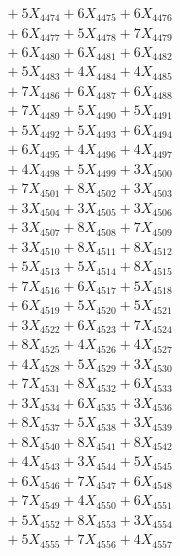 \documentclass[a4paper,10pt]{article}
\begin{document}
{\begin{align}
&\;  + 5 X_{4474} + 6 X_{4475} + 6 X_{4476} \\[0.3ex]
&\;  + 6 X_{4477} + 5 X_{4478} + 7 X_{4479} \\[0.5ex]\allowbreak
&\;  + 6 X_{4480} + 6 X_{4481} + 6 X_{4482} \\[0.3ex]
&\;  + 5 X_{4483} + 4 X_{4484} + 4 X_{4485} \\[0.3ex]
&\;  + 7 X_{4486} + 6 X_{4487} + 6 X_{4488} \\[0.3ex]
&\;  + 7 X_{4489} + 5 X_{4490} + 5 X_{4491} \\[0.3ex]
&\;  + 5 X_{4492} + 5 X_{4493} + 6 X_{4494} \\[0.3ex]
&\;  + 6 X_{4495} + 4 X_{4496} + 4 X_{4497} \\[0.3ex]
&\;  + 4 X_{4498} + 5 X_{4499} + 3 X_{4500} \\[0.3ex]
&\;  + 7 X_{4501} + 8 X_{4502} + 3 X_{4503} \\[0.3ex]
&\;  + 3 X_{4504} + 3 X_{4505} + 3 X_{4506} \\[0.3ex]
&\;  + 3 X_{4507} + 8 X_{4508} + 7 X_{4509} \\[0.5ex]\allowbreak
&\;  + 3 X_{4510} + 8 X_{4511} + 8 X_{4512} \\[0.3ex]
&\;  + 5 X_{4513} + 5 X_{4514} + 8 X_{4515} \\[0.3ex]
&\;  + 7 X_{4516} + 6 X_{4517} + 5 X_{4518} \\[0.3ex]
&\;  + 6 X_{4519} + 5 X_{4520} + 5 X_{4521} \\[0.3ex]
&\;  + 3 X_{4522} + 6 X_{4523} + 7 X_{4524} \\[0.3ex]
&\;  + 8 X_{4525} + 4 X_{4526} + 4 X_{4527} \\[0.3ex]
&\;  + 4 X_{4528} + 5 X_{4529} + 3 X_{4530} \\[0.3ex]
&\;  + 7 X_{4531} + 8 X_{4532} + 6 X_{4533} \\[0.3ex]
&\;  + 3 X_{4534} + 6 X_{4535} + 3 X_{4536} \\[0.3ex]
&\;  + 8 X_{4537} + 5 X_{4538} + 3 X_{4539} \\[0.5ex]\allowbreak
&\;  + 8 X_{4540} + 8 X_{4541} + 8 X_{4542} \\[0.3ex]
&\;  + 4 X_{4543} + 3 X_{4544} + 5 X_{4545} \\[0.3ex]
&\;  + 6 X_{4546} + 7 X_{4547} + 6 X_{4548} \\[0.3ex]
&\;  + 7 X_{4549} + 4 X_{4550} + 6 X_{4551} \\[0.3ex]
&\;  + 5 X_{4552} + 8 X_{4553} + 3 X_{4554} \\[0.3ex]
&\;  + 5 X_{4555} + 7 X_{4556} + 4 X_{4557} \\[0.3ex]

\end{align}}
\end{document}
